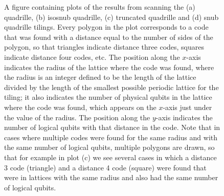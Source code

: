 \documentclass[12pt]{amsbook}
\theoremstyle{plain}
\theoremstyle{definition}
\theoremstyle{remark}
\begin{document}
\begin{figure}
\caption{
\label{figure:results-quadrille}
A figure containing plots of the results from scanning the (a) quadrille, (b) isosnub quadrille, (c) truncated quadrille and (d) snub quadrille tilings.  Every polygon in the plot corresponds to a code that was found with a distance equal to the number of sides of the polygon, so that triangles indicate distance three codes, squares indicate distance four codes, etc.  The position along the $x$-axis indicates the radius of the lattice where the code was found, where the radius is an integer defined to be the length of the lattice divided by the length of the smallest possible periodic lattice for the tiling;  it also indicates the number of physical qubits in the lattice where the code was found, which appears on the $x$-axis just under the value of the radius.  The position along the $y$-axis indicates the number of logical qubits with that distance in the code.
Note that in cases where multiple codes were found for the same radius and with the same number of logical qubits, multiple polygons are drawn, so that for example in plot (c) we see several cases in which a distance 3 code (triangle) and a distance 4 code (square) were found that were in lattices with the same radius and also had the same number of logical qubits.
}
\end{figure}
\end{document}
